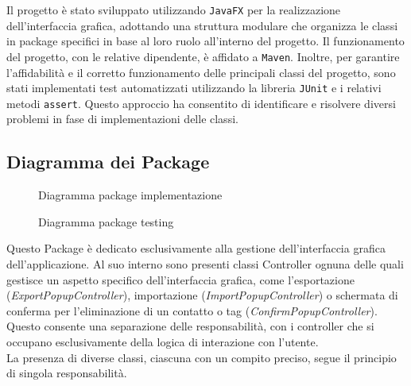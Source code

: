 Il progetto è stato sviluppato utilizzando \texttt{JavaFX} per la realizzazione dell'interfaccia grafica, adottando una struttura modulare che organizza le classi in package specifici in base al loro ruolo all'interno del progetto. Il funzionamento del progetto, con le relative dipendente, è affidato a \texttt{Maven}.\vspace{.3cm}
Inoltre, per garantire l'affidabilità e il corretto funzionamento delle principali classi del progetto, sono stati implementati test automatizzati utilizzando la libreria \texttt{JUnit} e i relativi metodi \texttt{assert}. Questo approccio ha consentito di identificare e risolvere diversi problemi in fase di implementazioni delle classi.
\subsection{Diagramma dei Package}
\begin{figure}[h]
	\begin{minipage}{0.5\textwidth}
		\centering
		
		\caption{Diagramma package implementazione}
		\label{fig:diagramma-package-implementazione}
	\end{minipage}%
	\hfill
	\begin{minipage}{0.5\textwidth}
		\centering
		
		\caption{Diagramma package testing}
		\label{fig:diagramma-package-testing}
	\end{minipage}
\end{figure}

\begin{tcolorbox}[colback=white,colframe=black!80!white,title=\textbf{Package controllers}]
	Questo Package è dedicato esclusivamente alla gestione dell'interfaccia grafica dell'applicazione. Al suo interno sono presenti classi Controller ognuna delle quali gestisce un aspetto specifico dell'interfaccia grafica, come l'esportazione (\textit{ExportPopupController}), importazione (\textit{ImportPopupController}) o schermata di conferma per l'eliminazione di un contatto o tag (\textit{ConfirmPopupController}). \\
	Questo consente una separazione delle responsabilità, con i controller che si occupano esclusivamente della logica di interazione con l'utente.
	\\La presenza di diverse classi, ciascuna con un compito preciso, segue il principio di singola responsabilità.
\end{tcolorbox}

